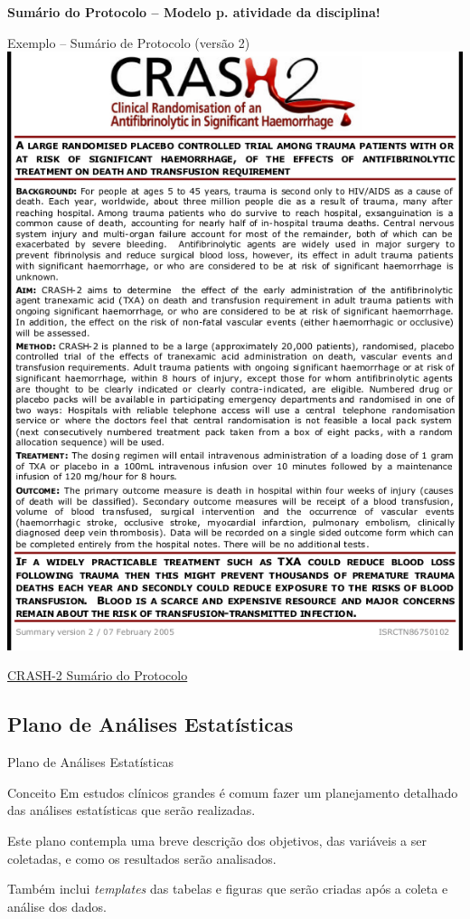 \documentclass{beamer}
\begin{document}
\begin{frame}{\small \bf Sumário do Protocolo -- Modelo p. atividade da disciplina!}
  \begin{exampleblock}{Exemplo -- Sumário de Protocolo (versão 2)}
    \centering
    \includegraphics[height=.8\textheight]{Planejamento/CRASH-proto4}

  \end{exampleblock}
  \vfill
  \scriptsize
  \hfill \href{http://www.crash2.lshtm.ac.uk/SummaryEng.htm}{CRASH-2 Sumário do Protocolo}
\end{frame}

\subsection[SAP]{Plano de Análises Estatísticas}

\begin{frame}{Plano de Análises Estatísticas}
  \begin{block}{Conceito}
    \footnotesize
    Em estudos clínicos grandes é comum fazer um planejamento detalhado das análises estatísticas que serão realizadas.

    \bigskip
    Este plano contempla uma breve descrição dos objetivos, das variáveis a ser coletadas, e como os resultados serão analisados.

    \bigskip
    Também inclui {\em templates} das tabelas e figuras que serão criadas após a coleta e análise dos dados.
  \end{block}
\end{frame}
\end{document}
